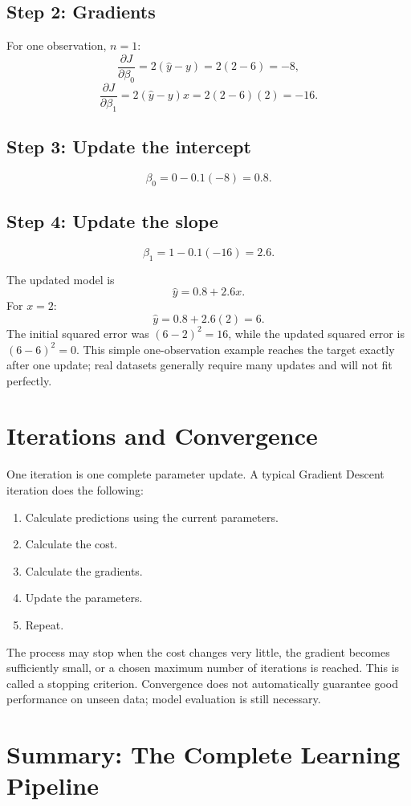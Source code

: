 \documentclass[11pt,a4paper]{article}
\begin{document}
\subsection*{Step 2: Gradients}
For one observation, $n=1$:
\[
\frac{\partial J}{\partial\beta_0}
=2(\hat y-y)=2(2-6)=-8,
\]
\[
\frac{\partial J}{\partial\beta_1}
=2(\hat y-y)x=2(2-6)(2)=-16.
\]

\subsection*{Step 3: Update the intercept}
\[
\beta_0=0-0.1(-8)=\boxed{0.8}.
\]

\subsection*{Step 4: Update the slope}
\[
\beta_1=1-0.1(-16)=\boxed{2.6}.
\]

The updated model is
\[
\hat y=0.8+2.6x.
\]
For $x=2$:
\[
\hat y=0.8+2.6(2)=6.
\]
The initial squared error was $(6-2)^2=16$, while the updated squared error is $(6-6)^2=0$. This simple one-observation example reaches the target exactly after one update; real datasets generally require many updates and will not fit perfectly.

\section{Iterations and Convergence}

One iteration is one complete parameter update. A typical Gradient Descent iteration does the following:
\begin{enumerate}
\item Calculate predictions using the current parameters.
\item Calculate the cost.
\item Calculate the gradients.
\item Update the parameters.
\item Repeat.
\end{enumerate}

The process may stop when the cost changes very little, the gradient becomes sufficiently small, or a chosen maximum number of iterations is reached. This is called a stopping criterion. Convergence does not automatically guarantee good performance on unseen data; model evaluation is still necessary.

\section{Summary: The Complete Learning Pipeline}
\end{document}
